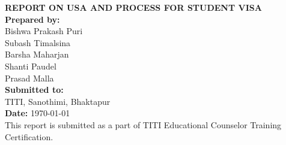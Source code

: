 \documentclass[12pt,a4paper]{article}
\begin{document}
\begin{titlepage}
    \centering
    {\LARGE \textbf{REPORT ON USA AND PROCESS FOR STUDENT VISA} \\[2em]}
    \vspace{1em}
    \textbf{Prepared by:} \\ [1em]
    Bishwa Prakash Puri \\
    Subash Timalsina\\
    Barsha Maharjan \\
    Shanti Paudel \\
    Prasad Malla \\[6em]
    \textbf{Submitted to:} \\TITI, Sanothimi, Bhaktapur \\[1em]
    \textbf{Date:} \today \\[2em]
    \vfill
    This report is submitted as a part of TITI Educational Counselor Training Certification.
    \vspace*{2em}
\end{titlepage}

\tableofcontents
\newpage










\end{document}

